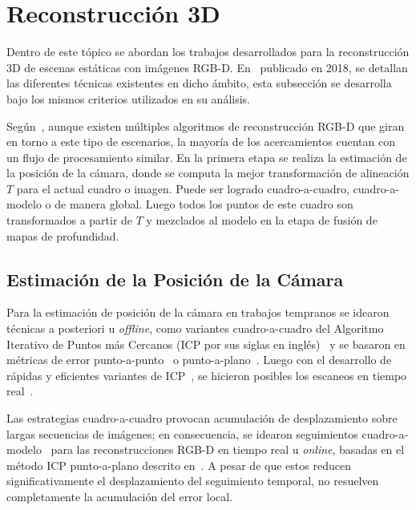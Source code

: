 \section{Reconstrucción 3D}

Dentro de este tópico se abordan los trabajos desarrollados para la reconstrucción 3D de escenas estáticas con imágenes RGB-D. En~\cite{zollhofer2018state} publicado en 2018, se detallan las diferentes técnicas existentes en dicho ámbito, esta subsección se desarrolla bajo los mismos criterios utilizados en su análisis.

Según~\cite{zollhofer2018state}, aunque existen múltiples algoritmos de reconstrucción RGB-D que giran en torno a este tipo de escenarios, la mayoría de los acercamientos cuentan con un flujo de procesamiento similar. En la primera etapa se realiza la estimación de la posición de la cámara, donde se computa la mejor transformación de alineación $T$ para el actual cuadro o imagen. Puede ser logrado cuadro-a-cuadro, cuadro-a-modelo o de manera global. Luego todos los puntos de este cuadro son transformados a partir de $T$ y mezclados al modelo en la etapa de fusión de mapas de profundidad.

\subsection{Estimación de la Posición de la Cámara}

Para la estimación de posición de la cámara en trabajos tempranos se idearon técnicas a posteriori u \textit{offline}, como variantes cuadro-a-cuadro del Algoritmo Iterativo de Puntos más Cercanos (ICP por sus siglas en inglés)~\cite{besl1992method, chen1992object} y se basaron en métricas de error punto-a-punto~\cite{chen1992object} o punto-a-plano~\cite{besl1992method}. Luego con el desarrollo de rápidas y eficientes variantes de ICP~\cite{rusinkiewicz2001efficient}, se hicieron posibles los escaneos en tiempo real~\cite{rusinkiewicz2002real}.

Las estrategias cuadro-a-cuadro provocan acumulación de desplazamiento sobre largas secuencias de imágenes; en consecuencia, se idearon seguimientos cuadro-a-modelo~\cite{chen2013scalable,izadi2011kinectfusion} para las reconstrucciones RGB-D en tiempo real u \textit{online}, basadas en el método ICP punto-a-plano descrito en~\cite{low2004linear}. A pesar de que estos reducen significativamente el desplazamiento del seguimiento temporal, no resuelven completamente la acumulación del error local.

